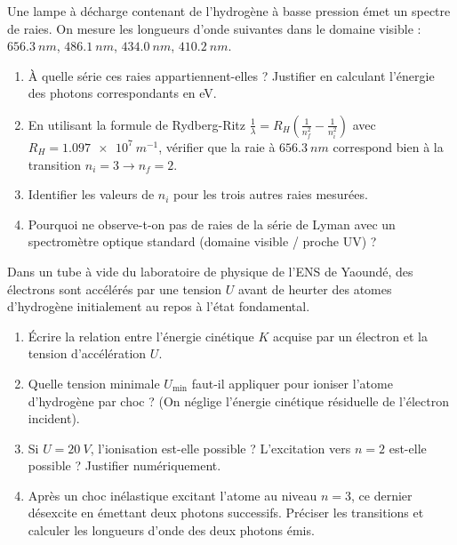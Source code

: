\documentclass[11pt]{article}
\begin{document}
\begin{exercice}
Une lampe à décharge contenant de l'hydrogène à basse pression émet un spectre de raies. On mesure les longueurs d'onde suivantes dans le domaine visible : $\SI{656,3}{nm}$, $\SI{486,1}{nm}$, $\SI{434,0}{nm}$, $\SI{410,2}{nm}$.
\begin{enumerate}
    \item À quelle série ces raies appartiennent-elles ? Justifier en calculant l'énergie des photons correspondants en \si{eV}.
    \item En utilisant la formule de Rydberg-Ritz $\frac{1}{\lambda} = R_H \left( \frac{1}{n_f^2} - \frac{1}{n_i^2} \right)$ avec $R_H = \SI{1,097e7}{m^{-1}}$, vérifier que la raie à $\SI{656,3}{nm}$ correspond bien à la transition $n_i=3 \to n_f=2$.
    \item Identifier les valeurs de $n_i$ pour les trois autres raies mesurées.
    \item Pourquoi ne observe-t-on pas de raies de la série de Lyman avec un spectromètre optique standard (domaine visible / proche UV) ?
\end{enumerate}
\end{exercice}

\begin{exercice}
Dans un tube à vide du laboratoire de physique de l'ENS de Yaoundé, des électrons sont accélérés par une tension $U$ avant de heurter des atomes d'hydrogène initialement au repos à l'état fondamental.
\begin{enumerate}
    \item Écrire la relation entre l'énergie cinétique $K$ acquise par un électron et la tension d'accélération $U$.
    \item Quelle tension minimale $U_{\text{min}}$ faut-il appliquer pour ioniser l'atome d'hydrogène par choc ? (On néglige l'énergie cinétique résiduelle de l'électron incident).
    \item Si $U = \SI{20}{V}$, l'ionisation est-elle possible ? L'excitation vers $n=2$ est-elle possible ? Justifier numériquement.
    \item Après un choc inélastique excitant l'atome au niveau $n=3$, ce dernier désexcite en émettant deux photons successifs. Préciser les transitions et calculer les longueurs d'onde des deux photons émis.
\end{enumerate}
\end{exercice}
\end{document}
